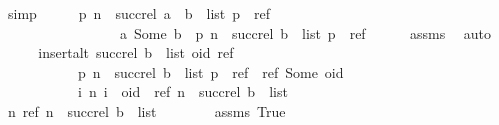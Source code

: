 \begin{isabellebody}
\ simp\isanewline
\ \ \isamarkupfalse%
\ \isamarkupfalse%
\ {\isachardoublequoteopen}{\isacharbraceleft}{\isacharparenleft}p{\isacharcomma}\ n{\isacharparenright}\ {\isasymin}\ succ{\isacharunderscore}rel\ {\isacharparenleft}a\ {\isacharhash}\ b\ {\isacharhash}\ list{\isacharparenright}{\isachardot}\ p\ {\isasymnoteq}\ ref{\isacharbraceright}\ {\isacharequal}\isanewline
\ \ \ \ \ \ \ \ \ \ \ \ \ \ \ \ \ {\isacharbraceleft}{\isacharparenleft}a{\isacharcomma}\ Some\ b{\isacharparenright}{\isacharbraceright}\ {\isasymunion}\ {\isacharbraceleft}{\isacharparenleft}p{\isacharcomma}\ n{\isacharparenright}\ {\isasymin}\ succ{\isacharunderscore}rel\ {\isacharparenleft}b\ {\isacharhash}\ list{\isacharparenright}{\isachardot}\ p\ {\isasymnoteq}\ ref{\isacharbraceright}{\isachardoublequoteclose}\isanewline
\ \ \ \ \isamarkupfalse%
\ assms{\isacharparenleft}{}{\isacharparenright}\ \isamarkupfalse%
\ auto\isanewline
\ \ \isamarkupfalse%
\ \isamarkupfalse%
\ {\isachardoublequoteopen}insert{\isacharunderscore}alt\ {\isacharparenleft}succ{\isacharunderscore}rel\ {\isacharparenleft}b\ {\isacharhash}\ list{\isacharparenright}{\isacharparenright}\ {\isacharparenleft}oid{\isacharcomma}\ ref{\isacharparenright}\ {\isacharequal}\isanewline
\ \ \ \ \ \ \ \ \ \ \ {\isacharbraceleft}{\isacharparenleft}p{\isacharcomma}\ n{\isacharparenright}\ {\isasymin}\ succ{\isacharunderscore}rel\ {\isacharparenleft}b\ {\isacharhash}\ list{\isacharparenright}{\isachardot}\ p\ {\isasymnoteq}\ ref{\isacharbraceright}\ {\isasymunion}\ {\isacharbraceleft}{\isacharparenleft}ref{\isacharcomma}\ Some\ oid{\isacharparenright}{\isacharbraceright}\ {\isasymunion}\isanewline
\ \ \ \ \ \ \ \ \ \ \ {\isacharbraceleft}{\isacharparenleft}i{\isacharcomma}\ n{\isacharparenright}{\isachardot}\ i\ {\isacharequal}\ oid\ {\isasymand}\ {\isacharparenleft}ref{\isacharcomma}\ n{\isacharparenright}\ {\isasymin}\ succ{\isacharunderscore}rel\ {\isacharparenleft}b\ {\isacharhash}\ list{\isacharparenright}{\isacharbraceright}{\isachardoublequoteclose}\isanewline
\ \ \isamarkupfalse%
\ {\isacharminus}\isanewline
\ \ \ \ \isamarkupfalse%
\ {\isachardoublequoteopen}{\isasymexists}n{\isachardot}\ {\isacharparenleft}ref{\isacharcomma}\ n{\isacharparenright}\ {\isasymin}\ succ{\isacharunderscore}rel\ {\isacharparenleft}b\ {\isacharhash}\ list{\isacharparenright}{\isachardoublequoteclose}\isanewline
\ \ \ \ \ \ \isamarkupfalse%
\ assms{\isacharparenleft}{}{\isacharparenright}\ True\ \isamarkupfalse%

\end{isabellebody}
